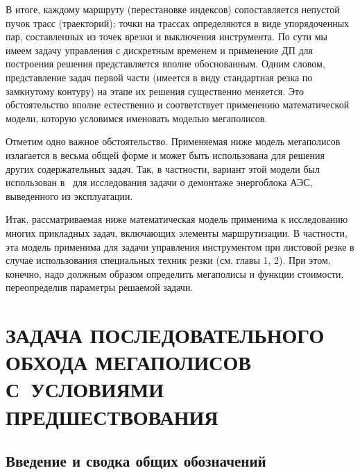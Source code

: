 \documentclass[11pt,twoside,openany]{report}
\begin{document}
В итоге,
каждому маршруту
(перестановке индексов)
сопоставляется непустой пучок трасс
(траекторий);
точки на трассах определяются
в виде упорядоченных пар,
составленных из точек врезки и выключения инструмента.
По сути мы имеем задачу управления с дискретным временем
и применение ДП для построения решения представляется
вполне обоснованным.
Одним словом,
представление задач первой части
(имеется в виду стандартная резка по замкнутому контуру)
на этапе их решения существенно меняется.
Это обстоятельство вполне естественно
и соответствует применению математической модели,
которую условимся именовать моделью мегаполисов.

Отметим одно важное обстоятельство.
Применяемая ниже модель мегаполисов
излагается в весьма общей форме и может быть
использована для решения других содержательных задач.
Так, в частности, вариант этой модели был использован
в~\cite{Cha2`}
для исследования задачи о демонтаже энергоблока АЭС,
выведенного из эксплуатации.

Итак,
рассматриваемая ниже математическая модель
применима к исследованию многих прикладных задач,
включающих элементы маршрутизации.
В частности,
эта модель применима для задачи управления
инструментом при листовой резке
в случае использования специальных техник резки
(см. главы 1, 2).
При этом, конечно,
надо должным образом определить
мегаполисы и функции стоимости,
переопределив параметры решаемой задачи.

\chapter{
  ЗАДАЧА ПОСЛЕДОВАТЕЛЬНОГО ОБХОДА МЕГАПОЛИСОВ
  С~УСЛОВИЯМИ ПРЕДШЕСТВОВАНИЯ
}
\setcounter{chapter}{3}
\setcounter{equation}{0}

{\raggedright\section{
  Введение и сводка общих обозначений
}}
\label{sect:3.1}
\end{document}
